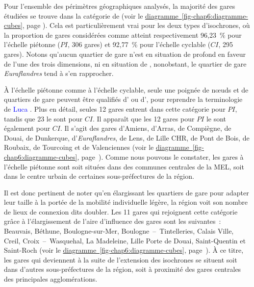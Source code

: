\begin{refsegment}
Pour l'ensemble des périmètres géographiques analysés, la majorité des gares étudiées se trouve dans la catégorie de  (voir le \hyperref[fig-chap6:diagramme-cubes]{diagramme~\ref{fig-chap6:diagramme-cubes}}, page \pageref{fig-chap6:diagramme-cubes}). Cela est particulièrement vrai pour les deux types d'isochrones, où la proportion de gares considérées comme  atteint respectivement 96,23~\% pour l'échelle piétonne (\(PI\), 306 gares) et 92,77~\% pour l'échelle cyclable (\(CI\), 295 gares). Notons qu'aucun quartier de gare n'est en situation de profond  en faveur de l'une des trois dimensions, ni en situation de , nonobstant, le quartier de gare \textsl{Euraflandres} tend à s'en rapprocher.%

À l'échelle piétonne comme à l'échelle cyclable, seule une poignée de nœuds et de quartiers de gare peuvent être qualifiés d' ou d', pour reprendre la terminologie de \textcolor{blue}{Luca} \textcolor{blue}{\textcite[202]{bertolini_spatial_1999}}. Plus en détail, seules 12 gares entrent dans cette catégorie pour \(PI\), tandis que 23 le sont pour \(CI\). Il apparaît que les 12 gares  pour \(PI\) le sont également pour \(CI\). Il s'agit des gares d'Amiens, d'Arras, de Compiègne, de Douai, de Dunkerque, d'\textsl{Euraflandres}, de Lens, de Lille CHR, de Pont de Bois, de Roubaix, de Tourcoing et de Valenciennes (voir le \hyperref[fig-chap6:diagramme-cubes]{diagramme~\ref{fig-chap6:diagramme-cubes}}, page~\pageref{fig-chap6:diagramme-cubes}). Comme nous pouvons le constater, les gares  à l'échelle piétonne sont soit situées dans des communes centrales de la \acrfull{MEL}, soit dans le centre urbain de certaines sous-préfectures de la région.%

Il est donc pertinent de noter qu'en élargissant les quartiers de gare pour adapter leur taille à la portée de la mobilité individuelle légère, la région voit son nombre de lieux de connexion dits  doubler. Les 11 gares qui rejoignent cette catégorie grâce à l'élargissement de l'aire d'influence des gares sont les suivantes~: Beauvais, Béthune, Boulogne-sur-Mer, Boulogne~–~Tintelleries, Calais Ville, Creil, Croix~–~Wasquehal, La Madeleine, Lille Porte de Douai, Saint-Quentin et Saint-Roch (voir le \hyperref[fig-chap6:diagramme-cubes]{diagramme~\ref{fig-chap6:diagramme-cubes}}, page~\pageref{fig-chap6:diagramme-cubes}). À ce titre, les gares qui deviennent  à la suite de l'extension des isochrones se situent soit dans d'autres sous-préfectures de la région, soit à proximité des gares centrales des principales agglomérations.%


\end{refsegment}
